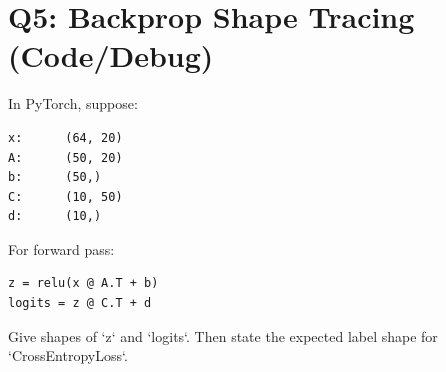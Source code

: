 \documentclass[11pt]{article}
\begin{document}
\section*{Q5: Backprop Shape Tracing (Code/Debug)}
In PyTorch, suppose:
\begin{verbatim}
x:      (64, 20)
A:      (50, 20)
b:      (50,)
C:      (10, 50)
d:      (10,)
\end{verbatim}
For forward pass:
\begin{verbatim}
z = relu(x @ A.T + b)
logits = z @ C.T + d
\end{verbatim}
Give shapes of `z` and `logits`. Then state the expected label shape for `CrossEntropyLoss`.
\end{document}

